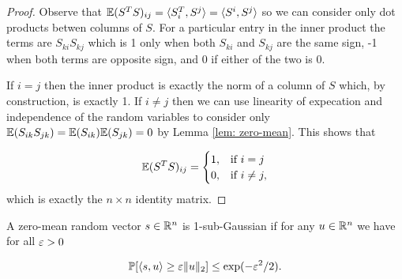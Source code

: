 \begin{proof}
  Observe that $\mathbb{E}(S^T S)_{ij} = \langle S^T_i, S^j \rangle = \langle S^i, S^j
  \rangle$ so we can consider only dot products betwen columns of $S$.
  For a particular entry in the inner product the terms are $S_{ki}S_{kj}$ which
  is 1 only when both $S_{ki}$ and $S_{kj}$ are the same sign, -1 when both
  terms are opposite sign, and 0 if either of the two is 0.

  If $i=j$ then the inner product is exactly the norm of a column of $S$
  which, by construction, is exactly 1.
  If $i \ne j$ then we can use linearity of expecation and independence of the
  random variables to consider only $\mathbb{E}(S_{ik} S_{jk}) = \mathbb{E}(S_{ik}) \mathbb{E}(S_{jk})
  = 0$ by Lemma \ref{lem: zero-mean}.
  This shows that

  \begin{equation*}
    \mathbb{E} (S^T S)_{ij} =
    \begin{cases}
      1, & \text{if}\ i = j \\
      0, & \text{if}\ i \ne j, \\
    \end{cases}
  \end{equation*}
  which is exactly the $n \times n$ identity matrix.

\end{proof}





\begin{mydef}
  A zero-mean random vector $s \in \mathbb{R}^n$ is 1-sub-Gaussian if for any $u \in \mathbb{R}^n$
  we have for all $\varepsilon > 0$

  \begin{equation}
    \mathbb{P} [ \langle s, u \rangle \ge \varepsilon \| u \|_2 ] \le \exp(-\varepsilon^2/2).
  \end{equation}
\end{mydef}

